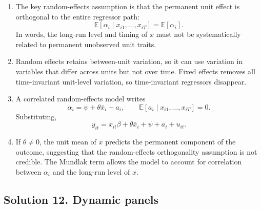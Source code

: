 \documentclass[11pt]{article}
\newcommand{\E}{\mathbb{E}}
\begin{document}
\begin{solutionbox}
\begin{enumerate}[label=(\alph*)]
\item The key random-effects assumption is that the permanent unit effect is orthogonal to the entire regressor path:
\[
\E[\alpha_i\mid x_{i1},\ldots,x_{iT}]=\E[\alpha_i].
\]
In words, the long-run level and timing of $x$ must not be systematically related to permanent unobserved unit traits.

\item Random effects retains between-unit variation, so it can use variation in variables that differ across units but not over time. Fixed effects removes all time-invariant unit-level variation, so time-invariant regressors disappear.

\item A correlated random-effects model writes
\[
\alpha_i=\psi+\theta \bar{x}_i+a_i,\qquad \E[a_i\mid x_{i1},\ldots,x_{iT}]=0.
\]
Substituting,
\[
y_{it}=x_{it}\beta+\theta \bar{x}_i+\psi+a_i+u_{it}.
\]

\item If $\theta\neq 0$, the unit mean of $x$ predicts the permanent component of the outcome, suggesting that the random-effects orthogonality assumption is not credible. The Mundlak term allows the model to account for correlation between $\alpha_i$ and the long-run level of $x$.
\end{enumerate}
\end{solutionbox}

\subsection*{Solution 12. Dynamic panels}
\end{document}
